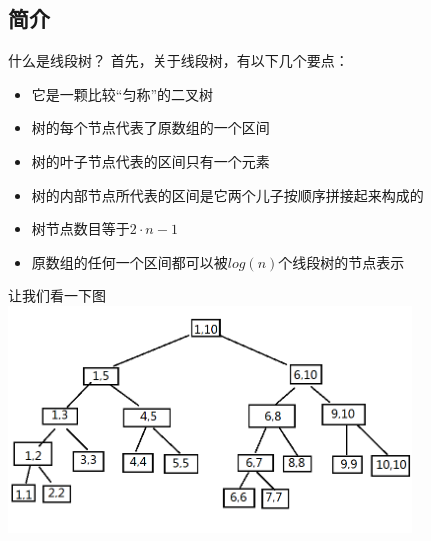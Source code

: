 \documentclass{beamer}
\begin{document}
		\subsection{简介}
			\begin{frame}{什么是线段树？}
				首先，关于线段树，有以下几个要点：
				\begin{itemize}
					\item 它是一颗比较“匀称”的二叉树
					\item 树的每个节点代表了原数组的一个区间
					\item 树的叶子节点代表的区间只有一个元素
					\item 树的内部节点所代表的区间是它两个儿子按顺序拼接起来构成的
					\item 树节点数目等于$2 \cdot n - 1$
					\item 原数组的任何一个区间都可以被$log(n)$个线段树的节点表示
				\end{itemize}
			\end{frame}
			\begin{frame}{让我们看一下图}
				\includegraphics[height=6cm]{segtree.png}
			\end{frame}
\end{document}
